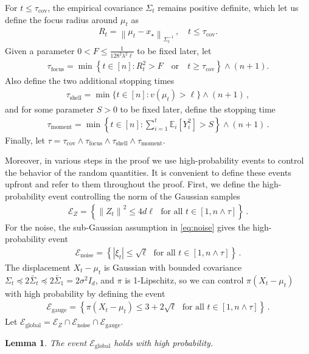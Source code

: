 \documentclass{article}
\newtheorem{lemma}[lemma]{Lemma}
\newcommand{\E}{\mathbb E}
\newcommand{\1}{\mathbf 1}
\newcommand{\norm}[1]{\left\lVert #1\right\rVert}
\begin{document}
For $t \leq \tau_{\mathrm{cov}}$, the empirical covariance $\Sigma_t$ remains positive definite, which let us define the focus radius around $\mu_t$ as
\begin{align}
    R_t = \left\|\mu_t - x_\star\right\|_{\Sigma_t^{-1}}\,, \quad t \leq \tau_{\mathrm{cov}}.
\end{align}
Given a parameter $0 < F \leq \frac{1}{128^2\lambda^2 \ell}$ to be fixed later, let
\begin{align}
    \tau_{\mathrm{focus}}
    =
    \min\left\{
    t \in [n]:
    R_t^2 > F
    \quad\text{or}\quad
    t \geq \tau_{\mathrm{cov}}
    \right\}
    \wedge (n + 1).
\end{align}
Also define the two additional stopping times
\begin{align}
    \tau_{\mathrm{shell}}
    =\min\{t\in[n]:v(\mu_{t})>\ell\}\wedge (n+1)\,,
    \label{eq:energy-shell-stopping-time}
\end{align}
and for some parameter $S > 0$ to be fixed later, define the stopping time
\begin{align}
    \tau_{\mathrm{moment}}
    =\min\left\{
    t \in [n]: \sum_{i=1}^{t} \E_i[Y_i^2] > S
    \right\}\wedge (n+1)\,.
\end{align}
Finally, let $\tau = \tau_{\mathrm{cov}} \wedge \tau_{\mathrm{focus}} \wedge \tau_{\mathrm{shell}} \wedge \tau_{\mathrm{moment}}.$

Moreover, in various steps in the proof we use high-probability events to control the behavior of the random quantities.
It is convenient to define these events upfront and refer to them throughout the proof.
First, we define the high-probability event controlling the norm of the Gaussian samples
\begin{align}
    \mathcal E_Z
    =\left\{\norm{Z_t}^2\leq4d\ell\,\,
    \text{ for all }t\in [1, n \wedge \tau]\right\}\,.
    \label{eq:gaussian-norm-event}
\end{align}
For the noise, the sub-Gaussian assumption in \eqref{eq:noise} gives the high-probability event
\begin{align}
    \mathcal E_{\mathrm{noise}}
    =\left\{|\xi_t|\leq\sqrt\ell\,\,
    \text{ for all }t\in [1, n \wedge \tau]\right\}\,.
    \label{eq:noise-cutoff-event}
\end{align}
The displacement $X_t - \mu_t$ is Gaussian with bounded covariance $\Sigma_t\preceq 2\bar{\Sigma}_t \preceq 2 \bar{\Sigma}_1 =2\sigma^2I_d$, and $\pi$ is 1-Lipschitz, so we can control $\pi(X_t - \mu_t)$ with high probability by defining the event
\begin{align}
    \mathcal E_{\mathrm{gauge}}
    =\left\{\pi(X_t - \mu_t)\leq3+2\sqrt\ell\,\,
    \text{ for all }t\in [1, n \wedge \tau]\right\}\,.
    \label{eq:gauge-cutoff-event}
\end{align}
Let $\mathcal E_{\mathrm{global}} = \mathcal E_Z \cap \mathcal E_{\mathrm{noise}} \cap \mathcal E_{\mathrm{gauge}}$.
\begin{lemma}
    The event $\mathcal E_{\mathrm{global}}$ holds with high probability.
\end{lemma}
\end{document}
